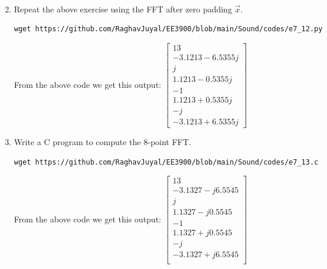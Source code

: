 \documentclass[journal,12pt,twocolumn]{IEEEtran}
\renewcommand\thesection{\arabic{section}}
\begin{document}
\begin{enumerate}[label=\arabic*.,ref=\thesection.\theenumi]
\begin{align}
	\end{align}
	\item Repeat the above exercise using the FFT
	after zero padding $\vec{x}$.\\
	\solution
	\begin{lstlisting}
wget https://github.com/RaghavJuyal/EE3900/blob/main/Sound/codes/e7_12.py
	\end{lstlisting}
	From the above code we get this output:
	$\begin{bmatrix}
		13\\
		-3.1213-6.5355j\\
		j\\
		1.1213-0.5355j\\
		-1\\
		1.1213+0.5355j\\
		-j\\
		-3.1213+6.5355j
	\end{bmatrix}$
	\item Write a C program to compute the 8-point FFT. \\
	\solution
	\begin{lstlisting}
wget https://github.com/RaghavJuyal/EE3900/blob/main/Sound/codes/e7_13.c
	\end{lstlisting}
	From the above code we get this output:
	$\begin{bmatrix}
		13\\
		-3.1327 - j6.5545\\
		j\\
		1.1327 - j0.5545\\
		-1\\
		1.1327 + j0.5545\\
		- j\\
		-3.1327 + j6.5545\\
	\end{bmatrix}$
	\vspace{1cm}
\end{enumerate}
\end{document}
